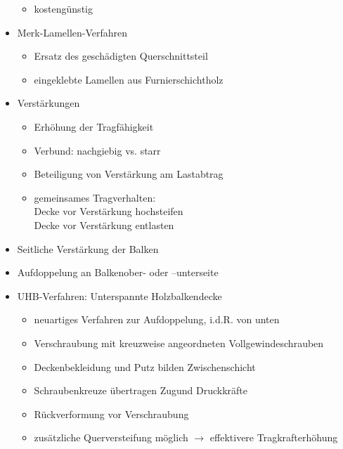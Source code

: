 \documentclass[fleqn,twoside,dvipsnames]{article}
\begin{document}
\begin{itemize}
\begin{itemize}
                    \item kostengünstig
                \end{itemize}
            \item Merk-Lamellen-Verfahren
                \begin{itemize}
                    \item Ersatz des geschädigten Querschnittsteil
                    \item eingeklebte Lamellen aus Furnierschichtholz
                \end{itemize}
            \item Verstärkungen
                \begin{itemize}
                    \item Erhöhung der Tragfähigkeit
                    \item Verbund: nachgiebig vs. starr
                    \item Beteiligung von Verstärkung am Lastabtrag
                    \item gemeinsames Tragverhalten:\\
                        Decke vor Verstärkung hochsteifen\\
                        Decke vor Verstärkung entlasten
                \end{itemize}
            \item Seitliche Verstärkung der Balken
            \item Aufdoppelung an Balkenober- oder –unterseite
            \item UHB-Verfahren: Unterspannte Holzbalkendecke \label{UHB/AHB}
                \begin{itemize}
                    \item neuartiges Verfahren zur Aufdoppelung, i.d.R. von unten
                    \item Verschraubung mit kreuzweise angeordneten Vollgewindeschrauben
                    \item Deckenbekleidung
                        und Putz bilden
                        Zwischenschicht
                    \item Schraubenkreuze
                        übertragen Zugund Druckkräfte
                    \item Rückverformung
                        vor Verschraubung
                    \item zusätzliche Querversteifung möglich
                        $\rightarrow$ effektivere Tragkrafterhöhung

\end{itemize}
\end{itemize}
\end{document}
